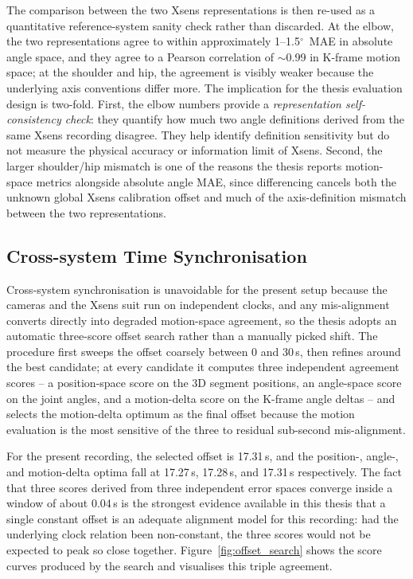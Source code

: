 \documentclass[12pt,a4paper]{article}
\newcommand{\degr}{\ensuremath{^\circ}}
\begin{document}
The comparison between the two Xsens representations is then re-used as a
quantitative reference-system sanity check rather than discarded.
At the elbow, the two representations agree to within approximately
1--1.5\degr\ MAE in absolute angle space, and they agree to a Pearson
correlation of $\sim$0.99 in K-frame motion space; at the shoulder and hip,
the agreement is visibly weaker because the underlying axis conventions
differ more.
The implication for the thesis evaluation design is two-fold.
First, the elbow numbers provide a \emph{representation self-consistency
check}: they quantify how much two angle definitions derived from the same
Xsens recording disagree.  They help identify definition sensitivity but do
not measure the physical accuracy or information limit of Xsens.
Second, the larger shoulder/hip mismatch is one of the reasons the thesis
reports motion-space metrics alongside absolute angle MAE, since
differencing cancels both the unknown global Xsens calibration offset and
much of the axis-definition mismatch between the two representations.

\subsection{Cross-system Time Synchronisation}

Cross-system synchronisation is unavoidable for the present setup because
the cameras and the Xsens suit run on independent clocks, and any
mis-alignment converts directly into degraded motion-space agreement, so
the thesis adopts an automatic three-score offset search rather than a
manually picked shift.
The procedure first sweeps the offset coarsely between 0 and 30\,s, then
refines around the best candidate; at every candidate it computes three
independent agreement scores -- a position-space score on the 3D segment
positions, an angle-space score on the joint angles, and a motion-delta
score on the K-frame angle deltas -- and selects the motion-delta optimum
as the final offset because the motion evaluation is the most sensitive of
the three to residual sub-second mis-alignment.

For the present recording, the selected offset is 17.31\,s, and the
position-, angle-, and motion-delta optima fall at 17.27\,s, 17.28\,s, and
17.31\,s respectively.
The fact that three scores derived from three independent error spaces
converge inside a window of about 0.04\,s is the strongest evidence
available in this thesis that a single constant offset is an adequate
alignment model for this recording: had the underlying clock relation been
non-constant, the three scores would not be expected to peak so close
together.
Figure~\ref{fig:offset_search} shows the score curves produced by the
search and visualises this triple agreement.
\end{document}
